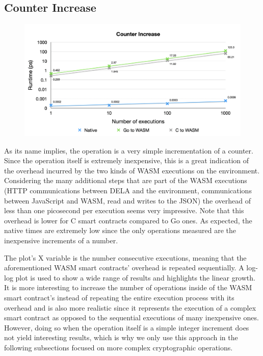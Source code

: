 \documentclass[11pt, a4paper, twoside, openright]{article}
\begin{document}
\subsection{Counter Increase}

\begin{figure}[H]
 \centering
  \includegraphics[width=13cm]{increase_counter.png}
\end{figure}

As its name implies, the operation is a very simple incrementation of a counter. Since the operation itself is extremely inexpensive, this is a great indication of the overhead incurred by the two kinds of WASM executions on the environment. Considering the many additional steps that are part of the WASM executions (HTTP communications between DELA and the environment, communications between JavaScript and WASM, read and writes to the JSON) the overhead of less than one picosecond per execution seems very impressive. Note that this overhead is lower for C smart contracts compared to Go ones. As expected, the native times are extremely low since the only operations measured are the inexpensive increments of a number.

The plot's X variable is the number consecutive executions, meaning that the aforementioned WASM smart contracts' overhead is repeated sequentially. A log-log plot is used to show a wide range of results and highlights the linear growth. It is more interesting to increase the number of operations inside of the WASM smart contract's instead of repeating the entire execution process with its overhead and is also more realistic since it represents the execution of a complex smart contract as opposed to the sequential executions of many inexpensive ones. However, doing so when the operation itself is a simple integer increment does not yield interesting results, which is why we only use this approach in the following subsections focused on more complex cryptographic operations.
\end{document}
